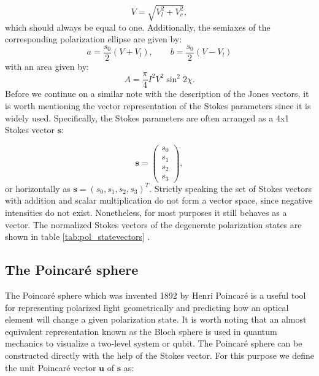 \begin{equation}
    V = \sqrt{V_l^2 + V_c^2},
\end{equation}
which should always be equal to one. Additionally, the semiaxes of the corresponding polarization ellipse are given by:
\begin{equation}
    a=\frac{s_0}{2}(V+V_l), \qquad b=\frac{s_0}{2}(V-V_l)
\end{equation}
with an area given by:
\begin{equation}
    A=\frac{\pi}{4}I^2V^2\sin^2 2\chi.
\end{equation}
Before we continue on a similar note with the description of the Jones vectors, it is worth mentioning the vector representation of the Stokes parameters since it is widely used. Specifically, the Stokes parameters are often arranged as a 4x1 Stokes vector $\bm{s}$:

\begin{equation}
    \bm{s}=
    \begin{pmatrix}
    s_0 \\
    s_1 \\
    s_2 \\
    s_3
    \end{pmatrix},
\end{equation}
or horizontally as $\bm{s}=(s_0, s_1, s_2, s_3)^T$. Strictly speaking the set of Stokes vectors with addition and scalar multiplication do not form a vector space, since negative intensities do not exist. Nonetheless, for most purposes it still behaves as a vector. The normalized Stokes vectors of the degenerate polarization states are shown in table \ref{tab:pol_statevectors} \cite{HechtOpticsEdition, Shurcliff1962PolarizedLight, GilPerez2017PolarizedApproach}.

\subsection{The Poincaré sphere}
\label{sec:the_poincare_sphere}
The Poincaré sphere which was invented 1892 by Henri Poincaré is a useful tool for representing polarized light geometrically and predicting how an optical element will change a given polarization state. It is worth noting that an almost equivalent representation known as the Bloch sphere is used in quantum mechanics to visualize a two-level system or qubit. The Poincaré sphere can be constructed directly with the help of the Stokes vector. For this purpose we define the unit Poincaré vector $\bm{u}$ of $\bm{s}$ as:

